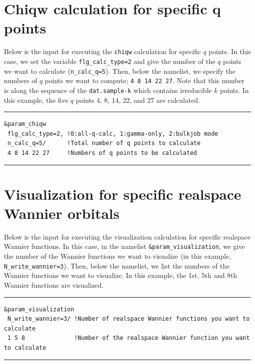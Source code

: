 \documentclass{article}
\begin{document}
\clearpage

\section{\label{bulkjob}Chiqw calculation for specific q points} 
Below is the input for executing the {\tt chiqw} calculation for specific $q$ points. In this case, we set the variable {\tt flg\_calc\_type=2} and give the number of the $q$ points we want to calculate ({\tt n\_calc\_q=5}). Then, below the namelist, we specify the numbers of $q$ points we want to compute; {\tt 4 8 14 22 27}. Note that this number is along the sequence of the {\tt dat.sample-k} which contains irreducible $k$ points. In this example, the five $q$ points 4, 8, 14, 22, and 27 are calculated.
\vspace{3mm}\hrule
\begin{verbatim}
&param_chiqw 
 flg_calc_type=2, !0:all-q-calc, 1:gamma-only, 2:bulkjob mode 
 n_calc_q=5/      !Total number of q points to calculate
 4 8 14 22 27     !Numbers of q points to be calculated
\end{verbatim}
\hrule\vspace{3mm}

\clearpage 

\section{\label{select-wannier}Visualization for specific realspace Wannier orbitals} 
Below is the input for executing the visualization calculation for specific realspace Wannier functions. In this case, in the namelist {\tt \&param\_visualization}, we give the number of the Wannier functions we want to visualize (in this example, {\tt N\_write\_wannier=3}). Then, below the namelist, we list the numbers of the Wannier functions we want to visualize. In this example, the 1st, 5th and 8th Wannier functions are visualized.
\vspace{3mm}\hrule
\begin{verbatim}
&param_visualization 
 N_write_wannier=3/ !Number of realspace Wannier functions you want to calculate
 1 5 8              !Number of the realspace Wannier function you want to calculate
\end{verbatim}
\hrule\vspace{3mm}

\clearpage 
\end{document}
